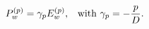 \begin{equation}
P_w^{(p)}
   =\gamma_p E_w^{(p)}, 
   \textrm{\,\,\, with } \gamma_p=-\frac{p}{D}.
\label{eq:eq_state}
\end{equation}

